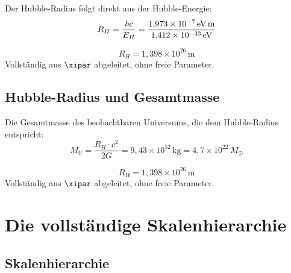 Der Hubble-Radius folgt direkt aus der Hubble-Energie:
\begin{equation}
	R_H = \frac{\hbar c}{E_H} = \frac{1{,}973 \times 10^{-7}\,\text{eV\,m}}{1{,}412 \times 10^{-33}\,\text{eV}}
\end{equation}

\begin{keyresult}
\begin{equation}
	\boxed{R_H = 1{,}398 \times 10^{26}\,\text{m}}
\end{equation}
Vollständig aus $\xipar$ abgeleitet, ohne freie Parameter.
\end{keyresult}

\subsection{Hubble-Radius und Gesamtmasse}

Die Gesamtmasse des beobachtbaren Universums, die dem Hubble-Radius entspricht:
\begin{equation}
	M_U = \frac{R_H \cdot c^2}{2G} = 9{,}43 \times 10^{52}\,\text{kg} = 4{,}7 \times 10^{22}\,M_\odot
\end{equation}

\begin{keyresult}
\begin{equation}
	\boxed{R_H = 1{,}398 \times 10^{26}\,\text{m}}
\end{equation}
Vollständig aus $\xipar$ abgeleitet, ohne freie Parameter.
\end{keyresult}

\section{Die vollständige Skalenhierarchie}

\subsection{Skalenhierarchie}

\begin{table}[h]
\centering
{}
\caption{Vollständige Skalenhierarchie aus $\xipar = 4/30000$}
\end{table}

